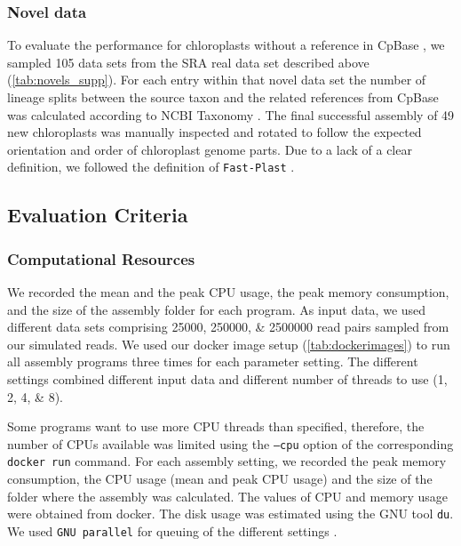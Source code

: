 \documentclass{bmcart}
\newcommand{\todo}[1]{\textcolor{red}{\bfseries(ToDO: #1})}
\newcommand{\formatprogramnames}[1]{\texttt{#1}}
\newcommand{\fp}{\formatprogramnames{Fast-Plast}}
\begin{document}
\subsubsection*{Novel data}
To evaluate the performance for chloroplasts without a reference in CpBase \cite{cpbase}, we sampled \num{105} data sets from the SRA \cite{sra2010} real data set described above (\cref{tab:novels_supp}).
For each entry within that novel data set the number of lineage splits between the source taxon and the related references from CpBase was calculated according to NCBI Taxonomy \cite{ncbitaxonomy}.
The final successful assembly of \num{49} new chloroplasts was manually inspected and rotated to follow the expected orientation and order of chloroplast genome parts.
Due to a lack of a clear definition, we followed the definition of \fp{} \cite{fastplast_orientation_issue}.

\subsection*{Evaluation Criteria}
\subsubsection*{Computational Resources}
We recorded the mean and the peak CPU usage, the peak memory consumption, and the size of the assembly folder for each program. 
As input data, we used different data sets comprising \numlist{25000;250000;2500000} read pairs sampled from  our simulated reads.
We used our docker image setup (\cref{tab:dockerimages}) to run all assembly programs three times for each parameter setting.
The different settings combined different input data and different number of threads to use (\numlist{1;2;4;8}).

Some programs want to use more CPU threads than specified, therefore, the number of CPUs available was limited using the \texttt{--cpu} option of the corresponding \texttt{docker run} command.
For each assembly setting, we recorded the peak memory consumption, the CPU usage (mean and peak CPU usage) and the size of the folder where the assembly was calculated.
The values of CPU and memory usage were obtained from docker.
The disk usage was estimated using the GNU tool \texttt{du}.
We used \texttt{GNU parallel} for queuing of the different settings \cite{Tange2011a}.
\end{document}
